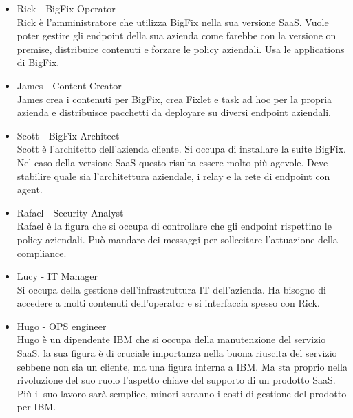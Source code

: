 \begin{itemize}
	\item Rick - BigFix Operator \\
	Rick è l'amministratore che utilizza BigFix nella sua versione SaaS. Vuole poter gestire gli endpoint della sua azienda come farebbe con la versione on premise, distribuire contenuti e forzare le policy aziendali. Usa le applications di BigFix.
	\item James - Content Creator \\
	James crea i contenuti per BigFix, crea Fixlet e task ad hoc per la propria azienda e distribuisce pacchetti da deployare su diversi endpoint aziendali.
	\item Scott - BigFix Architect \\
	Scott è l'architetto dell'azienda cliente. Si occupa di installare la suite BigFix. Nel caso della versione SaaS questo risulta essere molto più agevole. Deve stabilire quale sia l'architettura aziendale, i relay e la rete di endpoint con agent.
	\item  Rafael - Security Analyst \\
	Rafael è la figura che si occupa di controllare che gli endpoint rispettino le policy aziendali. Può mandare dei messaggi per sollecitare l'attuazione della compliance.
	\item Lucy - IT Manager \\
	Si occupa della gestione dell'infrastruttura IT dell'azienda. Ha bisogno di accedere a molti contenuti dell'operator e si interfaccia spesso con Rick.
	\item Hugo - OPS engineer \\
	Hugo è un dipendente IBM che si occupa della manutenzione del servizio SaaS. la sua figura è di cruciale importanza nella buona riuscita del servizio sebbene non sia un cliente, ma una figura interna a IBM. Ma sta proprio nella rivoluzione del suo ruolo l'aspetto chiave del supporto di un prodotto SaaS. Più il suo lavoro sarà semplice, minori saranno i costi di gestione del prodotto per IBM.
\end{itemize}

